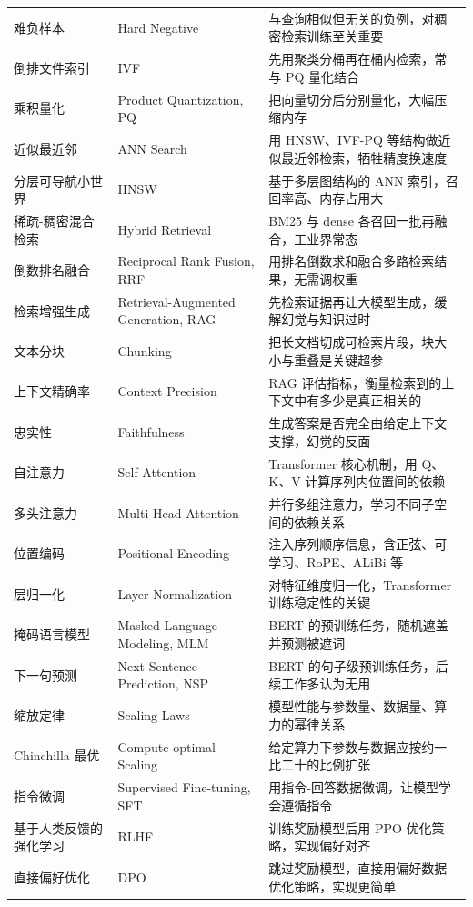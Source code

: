 \begin{xltabular}{\textwidth}{L{3.0cm} L{3.6cm} Y}
难负样本 & Hard Negative & 与查询相似但无关的负例，对稠密检索训练至关重要 \\
倒排文件索引 & IVF & 先用聚类分桶再在桶内检索，常与 PQ 量化结合 \\
乘积量化 & Product Quantization, PQ & 把向量切分后分别量化，大幅压缩内存 \\
近似最近邻 & ANN Search & 用 HNSW、IVF-PQ 等结构做近似最近邻检索，牺牲精度换速度 \\
分层可导航小世界 & HNSW & 基于多层图结构的 ANN 索引，召回率高、内存占用大 \\
稀疏-稠密混合检索 & Hybrid Retrieval & BM25 与 dense 各召回一批再融合，工业界常态 \\
倒数排名融合 & Reciprocal Rank Fusion, RRF & 用排名倒数求和融合多路检索结果，无需调权重 \\
检索增强生成 & Retrieval-Augmented Generation, RAG & 先检索证据再让大模型生成，缓解幻觉与知识过时 \\
文本分块 & Chunking & 把长文档切成可检索片段，块大小与重叠是关键超参 \\
上下文精确率 & Context Precision & RAG 评估指标，衡量检索到的上下文中有多少是真正相关的 \\
忠实性 & Faithfulness & 生成答案是否完全由给定上下文支撑，幻觉的反面 \\
自注意力 & Self-Attention & Transformer 核心机制，用 Q、K、V 计算序列内位置间的依赖 \\
多头注意力 & Multi-Head Attention & 并行多组注意力，学习不同子空间的依赖关系 \\
位置编码 & Positional Encoding & 注入序列顺序信息，含正弦、可学习、RoPE、ALiBi 等 \\
层归一化 & Layer Normalization & 对特征维度归一化，Transformer 训练稳定性的关键 \\
掩码语言模型 & Masked Language Modeling, MLM & BERT 的预训练任务，随机遮盖并预测被遮词 \\
下一句预测 & Next Sentence Prediction, NSP & BERT 的句子级预训练任务，后续工作多认为无用 \\
缩放定律 & Scaling Laws & 模型性能与参数量、数据量、算力的幂律关系 \\
Chinchilla 最优 & Compute-optimal Scaling & 给定算力下参数与数据应按约一比二十的比例扩张 \\
指令微调 & Supervised Fine-tuning, SFT & 用指令-回答数据微调，让模型学会遵循指令 \\
基于人类反馈的强化学习 & RLHF & 训练奖励模型后用 PPO 优化策略，实现偏好对齐 \\
直接偏好优化 & DPO & 跳过奖励模型，直接用偏好数据优化策略，实现更简单 \\

\end{xltabular}
